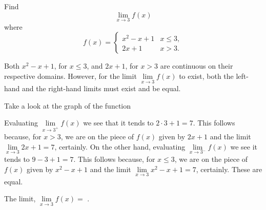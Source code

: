 \documentclass{ximera}
\begin{document}
\begin{question}
  Find 
  \[
  \displaystyle \lim_{x\to 3} f(x)
  \]
  where
  \[
  f(x) = \left\{\begin{array}{cl} x^2-x+1 & x\leq 3, \\ 2x+1 & x>3. \end{array}\right.
  \]
  \begin{solution}
    \begin{hint}
     Both $x^2-x+1$, for $x\leq3$, and $2x+1$, for $x>3$ are continuous on their respective domains. However, for the limit $\lim\limits_{x\to3}f(x)$ to exist, both the left-hand and the right-hand limits must exist and be equal.
    \end{hint}
     \begin{hint}
    	Take a look at the graph of the function
    \begin{center}
      \end{center} 
    \end{hint}
    \begin{hint}
     Evaluating $\lim\limits_{x\to3^{+}}f(x)$ we see that it tends to $2\cdot3+1=7$. This follows because, for $x>3$, we are on the piece of $f(x)$ given by $2x+1$ and the limit $\lim\limits_{x\to3}2x+1=7$, certainly. On the other hand, evaluating $\lim\limits_{x\to3^{-}}f(x)$ we see it tends to $9-3+1=7$. This follows because, for $x\leq3$, we are on the piece of $f(x)$ given by $x^2-x+1$ and the limit $\lim\limits_{x\to3}x^2-x+1=7$, certainly. These are equal.
    \end{hint}
     The limit, $\lim\limits_{x\to3}f(x)=$
    .
  \end{solution}
\end{question}
\end{document}
